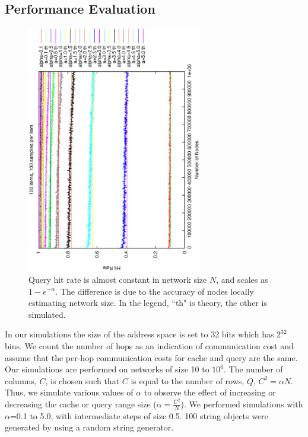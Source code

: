 \documentclass[conference]{IEEEtran}
\begin{document}
\subsection{Performance Evaluation} 
\begin{figure}
\centering
\includegraphics[angle=270,width=3in]{th_hitrate}
\caption{Query hit rate is almost constant in network size $N$, and scales
as $1-e^{-\alpha}$. The difference is due to the accuracy of nodes locally 
estimating network size. In the legend, ``th" is theory, the other is simulated.} \label{fig:hitrate}
\end{figure}
In our simulations the size of the address space is set to 32 bits which has $2^{32}$
bins. 
We count the number of hops as an indication of communication cost and assume that the 
per-hop communication costs for cache and query are the same. 
Our simulations are performed on networks of size 10 to $10^{6}$.
The number of columns, $C$, is chosen such that $C$ is equal to the number of rows, $Q$, 
$C^2 = \alpha N$. Thus, we simulate various values of $\alpha$ to observe the effect of
increasing or decreasing the cache or query range size ($\alpha=\frac{C^2}{N}$). 
We performed simulations with $\alpha$=0.1 to 5.0, with intermediate steps of size 0.5.
100 string objects were generated by using a random string generator.
\end{document}
